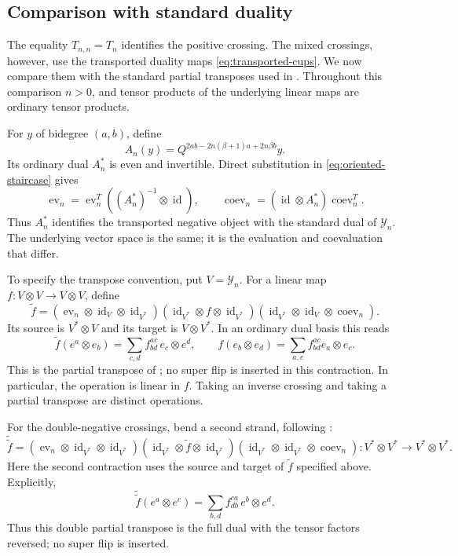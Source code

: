\documentclass[11pt,a4paper]{article}
\newcommand{\ot}{\otimes}
\newcommand{\id}{\operatorname{id}}
\newcommand{\ev}{\operatorname{ev}}
\newcommand{\coev}{\operatorname{coev}}
\theoremstyle{definition}
\theoremstyle{remark}
\begin{document}
\subsection{Comparison with standard duality}
\label{sec:standard-duality}

The equality \(T_{n,n}=T_n\) identifies the positive crossing.
The mixed crossings, however, use the transported duality maps
\eqref{eq:transported-cups}.  We now compare them with the standard
partial transposes used in \cite[Section~2]{GK}.  Throughout this
comparison \(n>0\), and tensor products of the underlying linear maps
are ordinary tensor products.

For \(y\) of bidegree \((a,b)\), define
\[
 A_n(y)=Q^{2ab-2n(\beta+1)a+2n\beta b}y.
\]
Its ordinary dual \(A_n^*\) is even and invertible.  Direct substitution
in \eqref{eq:oriented-staircase} gives
\begin{equation}\label{eq:cup-gauge}
 \ev_n=\ev_n^T((A_n^*)^{-1}\ot\id),\qquad
 \coev_n=(\id\ot A_n^*)\coev_n^T.
\end{equation}
Thus \(A_n^*\) identifies the transported negative object with the
standard dual of \(\mathcal Y_n\).  The underlying vector space is the
same; it is the evaluation and coevaluation that differ.

To specify the transpose convention, put \(V=\mathcal Y_n\).
For a linear map \(f:V\ot V\to V\ot V\), define
\begin{equation}\label{eq:standard-partial-transpose}
 \widetilde f
 =(\ev_n\ot\id_V\ot\id_{V^*})
 (\id_{V^*}\ot f\ot\id_{V^*})
 (\id_{V^*}\ot\id_V\ot\coev_n).
\end{equation}
Its source is \(V^*\ot V\) and its target is \(V\ot V^*\).
In an ordinary dual basis this reads
\[
 \widetilde f(e^a\ot e_b)
 =\sum_{c,d}f_{bd}^{ac}\,e_c\ot e^d,
 \qquad f(e_b\ot e_d)=\sum_{a,c}f_{bd}^{ac}e_a\ot e_c.
\]
This is the partial transpose of \cite[Section~2.1]{GK}; no super flip
is inserted in this contraction.  In particular, the operation is
linear in \(f\).  Taking an inverse crossing and taking a partial
transpose are distinct operations.

For the double-negative crossings, bend a second strand, following
\cite[Section~2, equations~(10)--(11)]{KashaevLong}:
\[
 \widetilde{\widetilde f}
 =(\ev_n\ot\id_{V^*}\ot\id_{V^*})
 (\id_{V^*}\ot\widetilde f\ot\id_{V^*})
 (\id_{V^*}\ot\id_{V^*}\ot\coev_n)
 :V^*\ot V^*\longrightarrow V^*\ot V^*.
\]
Here the second contraction uses the source and target of
\(\widetilde f\) specified above.  Explicitly,
\[
 \widetilde{\widetilde f}(e^a\ot e^c)
 =\sum_{b,d}f_{db}^{ca}\,e^b\ot e^d.
\]
Thus this double partial transpose is the full dual with the tensor
factors reversed; no super flip is inserted.
\end{document}
